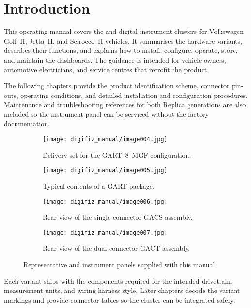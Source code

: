 \chapter{Introduction}\label{ch:introduction}

This operating manual covers the \ReplicaGenOne{} and \ReplicaNextLong{} digital instrument clusters for Volkswagen Golf~II, Jetta~II, and Scirocco~II vehicles. It summarises the hardware variants, describes their functions, and explains how to install, configure, operate, store, and maintain the dashboards. The guidance is intended for vehicle owners, automotive electricians, and service centres that retrofit the product.

The following chapters provide the product identification scheme, connector pin-outs, operating conditions, and detailed installation and configuration procedures. Maintenance and troubleshooting references for both Replica generations are also included so the instrument panel can be serviced without the factory documentation.

\begin{figure}[htbp]
    \centering
    \begin{subfigure}{0.48\textwidth}
        \texttt{[image: digifiz\_manual/image004.jpg]}
        \caption{Delivery set for the GART~8--MGF configuration.}
    \end{subfigure}\hfill
    \begin{subfigure}{0.48\textwidth}
        \texttt{[image: digifiz\_manual/image005.jpg]}
        \caption{Typical contents of a GART package.}
    \end{subfigure}
    \begin{subfigure}{0.48\textwidth}
        \texttt{[image: digifiz\_manual/image006.jpg]}
        \caption{Rear view of the single-connector GACS assembly.}
    \end{subfigure}\hfill
    \begin{subfigure}{0.48\textwidth}
        \texttt{[image: digifiz\_manual/image007.jpg]}
        \caption{Rear view of the dual-connector GACT assembly.}
    \end{subfigure}
    \caption{Representative \ReplicaGenOne{} and \ReplicaNextLong{} instrument panels supplied with this manual.}
\end{figure}

Each variant ships with the components required for the intended drivetrain, measurement units, and wiring harness style. Later chapters decode the variant markings and provide connector tables so the cluster can be integrated safely.
